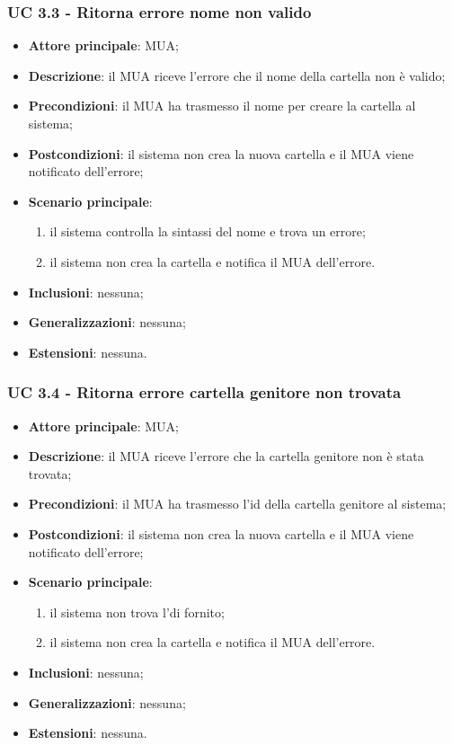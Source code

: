     \subsubsection{UC 3.3 - Ritorna errore nome non valido} \label{sec:UC3.3}
    \begin{itemize}
        \item \textbf{Attore principale}: MUA;
        \item \textbf{Descrizione}: il MUA riceve l'errore che il nome della cartella non è valido;
        \item \textbf{Precondizioni}:  il MUA ha trasmesso il nome per creare la cartella al sistema;
        \item \textbf{Postcondizioni}: il sistema non crea la nuova cartella e il MUA viene notificato dell'errore;
        \item \textbf{Scenario principale}:
            \begin{enumerate}
                \item il sistema controlla la sintassi del nome e trova un errore;
                \item il sistema non crea la cartella e notifica il MUA dell'errore.
            \end{enumerate}
        \item \textbf{Inclusioni}: nessuna;
        \item \textbf{Generalizzazioni}: nessuna;
        \item \textbf{Estensioni}: nessuna.
    \end{itemize}

    \subsubsection{UC 3.4 - Ritorna errore cartella genitore non trovata} \label{sec:UC3.4}
    \begin{itemize}
        \item \textbf{Attore principale}: MUA;
        \item \textbf{Descrizione}: il MUA riceve l'errore che la cartella genitore non è stata trovata;
        \item \textbf{Precondizioni}: il MUA ha trasmesso l'id della cartella genitore al sistema;
        \item \textbf{Postcondizioni}: il sistema non crea la nuova cartella e il MUA viene notificato dell'errore;
        \item \textbf{Scenario principale}:
            \begin{enumerate}
                \item il sistema non trova l'di fornito;
                \item il sistema non crea la cartella e notifica il MUA dell'errore.
            \end{enumerate}
        \item \textbf{Inclusioni}: nessuna;
        \item \textbf{Generalizzazioni}: nessuna;
        \item \textbf{Estensioni}: nessuna.
    \end{itemize}


